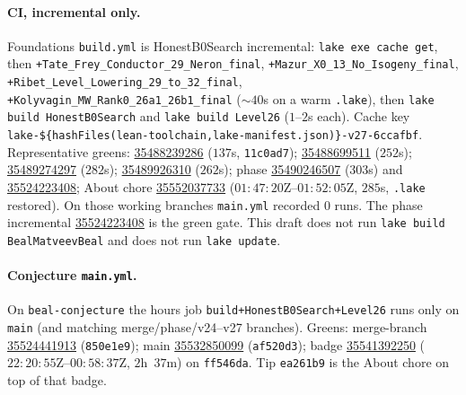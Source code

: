 \paragraph{CI, incremental only.}
Foundations \texttt{build.yml} is HonestB0Search incremental:
\texttt{lake exe cache get}, then
\texttt{+Tate\_Frey\_Conductor\_29\_Neron\_final},
\texttt{+Mazur\_X0\_13\_No\_Isogeny\_final},
\texttt{+Ribet\_Level\_Lowering\_29\_to\_32\_final},
\texttt{+Kolyvagin\_MW\_Rank0\_26a1\_26b1\_final}
($\sim 40$s on a warm \texttt{.lake}), then
\texttt{lake build HonestB0Search} and \texttt{lake build Level26}
($1$--$2$s each). Cache key
\texttt{lake-\$\{hashFiles(lean-toolchain,lake-manifest.json)\}-v27-6ccafbf}.
Representative greens:
\href{https://github.com/DavidFox998/beal-level-26-foundations/actions/runs/35488239286}{35488239286}
($137$s, \texttt{11c0ad7});
\href{https://github.com/DavidFox998/beal-level-26-foundations/actions/runs/35488699511}{35488699511}
($252$s);
\href{https://github.com/DavidFox998/beal-level-26-foundations/actions/runs/35489274297}{35489274297}
($282$s);
\href{https://github.com/DavidFox998/beal-level-26-foundations/actions/runs/35489926310}{35489926310}
($262$s);
phase
\href{https://github.com/DavidFox998/beal-level-26-foundations/actions/runs/35490246507}{35490246507}
($303$s) and
\href{https://github.com/DavidFox998/beal-level-26-foundations/actions/runs/35524223408}{35524223408};
About chore
\href{https://github.com/DavidFox998/beal-level-26-foundations/actions/runs/35552037733}{35552037733}
($01{:}47{:}20$Z--$01{:}52{:}05$Z, $285$s, \texttt{.lake} restored).
On those working branches \texttt{main.yml} recorded $0$ runs.
The phase incremental
\href{https://github.com/DavidFox998/beal-level-26-foundations/actions/runs/35524223408}{35524223408}
is the green gate. This draft does not run
\texttt{lake build BealMatveevBeal} and does not run
\texttt{lake update}.

\paragraph{Conjecture \texttt{main.yml}.}
On \texttt{beal-conjecture} the hours job
\texttt{build+HonestB0Search+Level26} runs only on \texttt{main}
(and matching merge/phase/v24--v27 branches). Greens:
merge-branch
\href{https://github.com/DavidFox998/beal-conjecture/actions/runs/35524441913}{35524441913}
(\texttt{850e1e9});
main
\href{https://github.com/DavidFox998/beal-conjecture/actions/runs/35532850099}{35532850099}
(\texttt{af520d3});
badge
\href{https://github.com/DavidFox998/beal-conjecture/actions/runs/35541392250}{35541392250}
($22{:}20{:}55$Z--$00{:}58{:}37$Z, $2$h~$37$m) on
\texttt{ff546da}. Tip \texttt{ea261b9} is the About chore on top
of that badge.
